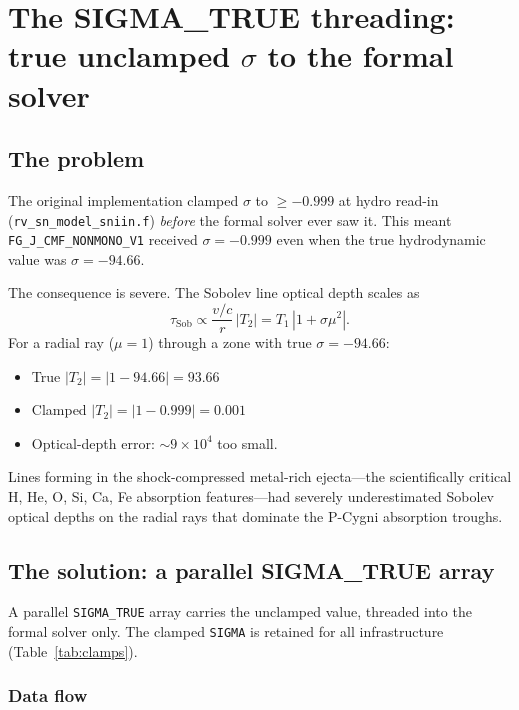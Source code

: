 \documentclass[11pt,a4paper]{article}
\begin{document}
\section{The SIGMA\_TRUE threading: true unclamped \texorpdfstring{$\sigma$}{sigma} to the formal solver}
\label{sec:sigma_true}

\subsection{The problem}

The original implementation clamped $\sigma$ to $\geq -0.999$ at hydro
read-in (\texttt{rv\_sn\_model\_sniin.f}) \emph{before} the formal solver
ever saw it.  This meant \texttt{FG\_J\_CMF\_NONMONO\_V1} received
$\sigma = -0.999$ even when the true hydrodynamic value was
$\sigma = -94.66$.

The consequence is severe.  The Sobolev line optical depth scales as
\begin{equation}
  \tau_{\mathrm{Sob}} \propto \frac{v/c}{r}\,|T_2| = T_1\,|1 + \sigma\mu^2| .
  \label{eq:tau_sob}
\end{equation}
For a radial ray ($\mu = 1$) through a zone with true $\sigma = -94.66$:
\begin{itemize}[noitemsep]
  \item True $|T_2| = |1 - 94.66| = 93.66$
  \item Clamped $|T_2| = |1 - 0.999| = 0.001$
  \item Optical-depth error: $\sim 9 \times 10^4$ too small.
\end{itemize}
Lines forming in the shock-compressed metal-rich ejecta---the
scientifically critical H, He, O, Si, Ca, Fe absorption features---had
severely underestimated Sobolev optical depths on the radial rays that
dominate the P-Cygni absorption troughs.

\subsection{The solution: a parallel SIGMA\_TRUE array}

A parallel \texttt{SIGMA\_TRUE} array carries the unclamped value,
threaded into the formal solver only.  The clamped \texttt{SIGMA} is
retained for all infrastructure (Table~\ref{tab:clamps}).

\subsubsection{Data flow}
\end{document}
